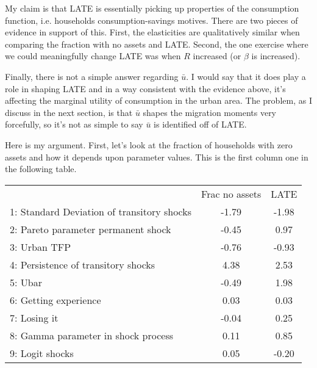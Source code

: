 \documentclass[pdftex,11pt]{article}
\renewcommand{\arraystretch}{.7}
\begin{document}
My claim is that LATE is essentially picking up properties of the consumption function, i.e. households consumption-savings motives. There are two pieces of evidence in support of this. First, the elasticities are qualitatively similar when comparing the fraction with no assets and LATE. Second, the one exercise where we could meaningfully change LATE was when $R$ increased (or $\beta$ is increased). 

Finally, there is not a simple answer regarding $\bar u$. I would say that it does play a role in shaping LATE and in a way consistent with the evidence above, it's affecting the marginal utility of consumption in the urban area. The problem, as I discuss in the next section, is that $\bar u$ shapes the migration moments very forcefully, so it's not as simple to say $\bar u$ is identified off of LATE.

Here is my argument. First, let's look at the fraction of households with zero assets and how it depends upon parameter values. This is the first column one in the following table.

\begin{table}[!h]
\footnotesize
\setlength {\tabcolsep}{1.5mm}
\renewcommand{\arraystretch}{2.25}
\begin{center}\label{tb:employment}
\begin{tabular}{l c c}
\hline
\hline
& Frac no assets & LATE \\
1: Standard Deviation of transitory shocks & -1.79   & -1.98  \\
2: Pareto parameter permanent shock &  -0.45         &  0.97  \\
3: Urban TFP &                           -0.76       & -0.93  \\
4: Persistence of transitory shocks &         4.38   &  2.53  \\
5: Ubar &                                    -0.49   &  1.98  \\
6: Getting experience &                       0.03   &  0.03  \\
7: Losing it &                               -0.04   &  0.25  \\
8: Gamma parameter in shock process &         0.11   &  0.85  \\
9: Logit shocks &                             0.05   & -0.20  \\
\hline                                       
\hline
\end{tabular}
\end{center}
\end{table}
\end{document}

